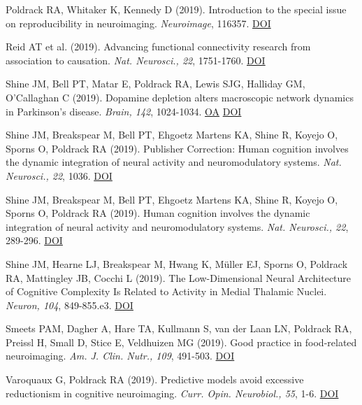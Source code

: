 Poldrack RA, Whitaker K, Kennedy D (2019). Introduction to the special issue on reproducibility in neuroimaging. \textit{Neuroimage}, 116357. \href{http://dx.doi.org/10.1016/j.neuroimage.2019.116357}{DOI} \vspace{2mm}

Reid AT et al. (2019). Advancing functional connectivity research from association to causation. \textit{Nat. Neurosci., 22}, 1751-1760. \href{http://dx.doi.org/10.1038/s41593-019-0510-4}{DOI} \vspace{2mm}

Shine JM, Bell PT, Matar E, Poldrack RA, Lewis SJG, Halliday GM, O'Callaghan C (2019). Dopamine depletion alters macroscopic network dynamics in Parkinson's disease. \textit{Brain, 142}, 1024-1034. \href{https://www.ncbi.nlm.nih.gov/pmc/articles/PMC6904322}{OA} \href{http://dx.doi.org/10.1093/brain/awz034}{DOI} \vspace{2mm}

Shine JM, Breakspear M, Bell PT, Ehgoetz Martens KA, Shine R, Koyejo O, Sporns O, Poldrack RA (2019). Publisher Correction: Human cognition involves the dynamic integration of neural activity and neuromodulatory systems. \textit{Nat. Neurosci., 22}, 1036. \href{http://dx.doi.org/10.1038/s41593-019-0347-x}{DOI} \vspace{2mm}

Shine JM, Breakspear M, Bell PT, Ehgoetz Martens KA, Shine R, Koyejo O, Sporns O, Poldrack RA (2019). Human cognition involves the dynamic integration of neural activity and neuromodulatory systems. \textit{Nat. Neurosci., 22}, 289-296. \href{http://dx.doi.org/10.1038/s41593-018-0312-0}{DOI} \vspace{2mm}

Shine JM, Hearne LJ, Breakspear M, Hwang K, Müller EJ, Sporns O, Poldrack RA, Mattingley JB, Cocchi L (2019). The Low-Dimensional Neural Architecture of Cognitive Complexity Is Related to Activity in Medial Thalamic Nuclei. \textit{Neuron, 104}, 849-855.e3. \href{http://dx.doi.org/10.1016/j.neuron.2019.09.002}{DOI} \vspace{2mm}

Smeets PAM, Dagher A, Hare TA, Kullmann S, van der Laan LN, Poldrack RA, Preissl H, Small D, Stice E, Veldhuizen MG (2019). Good practice in food-related neuroimaging. \textit{Am. J. Clin. Nutr., 109}, 491-503. \href{http://dx.doi.org/10.1093/ajcn/nqy344}{DOI} \vspace{2mm}

Varoquaux G, Poldrack RA (2019). Predictive models avoid excessive reductionism in cognitive neuroimaging. \textit{Curr. Opin. Neurobiol., 55}, 1-6. \href{http://dx.doi.org/10.1016/j.conb.2018.11.002}{DOI} \vspace{2mm}

